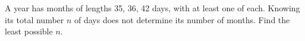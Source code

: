 A year has months of lengths 35, 36, 42 days, with at least one of each. Knowing its total number $n$ of days does not determine its number of months. Find the least possible $n$.

